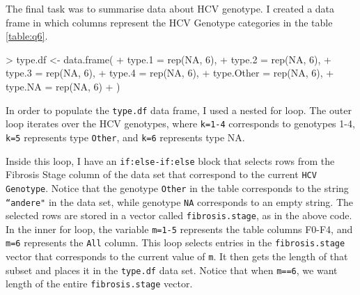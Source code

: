 \documentclass{article}
\begin{document}
\begin{enumerate}
\begin{enumerate}
The final task was to summarise data about HCV genotype. I created a data frame in which columns represent the HCV Genotype categories in the table \ref{table:q6}. 
\begin{Schunk}
\begin{Sinput}
> type.df <- data.frame(
+   type.1 = rep(NA, 6),
+   type.2 = rep(NA, 6),
+   type.3 = rep(NA, 6),
+   type.4 = rep(NA, 6),
+   type.Other = rep(NA, 6),
+   type.NA = rep(NA, 6)
+ )
\end{Sinput}
\end{Schunk}
In order to populate the \texttt{type.df} data frame, I used a nested for loop. The outer loop iterates over the HCV genotypes, where \texttt{k=1-4} corresponds to genotypes 1-4, \texttt{k=5} represents type \texttt{Other}, and \texttt{k=6} represents type {NA}. 
\begin{Schunk}
\end{Schunk}
Inside this loop, I have an \texttt{if:else-if:else} block that selects rows from the Fibrosis Stage column of the data set that correspond to the current \texttt{HCV Genotype}. Notice that the genotype \texttt{Other} in the table corresponds to the string \texttt{``andere"} in the data set, while genotype \texttt{NA} corresponds to an empty string. The selected rows are stored in a vector called \texttt{fibrosis.stage}, as in the above code.\\
In the inner for loop, the variable \texttt{m=1-5} represents the table columns F0-F4, and \texttt{m=6} represents the \texttt{All} column. This loop selects entries in the \texttt{fibrosis.stage} vector that corresponds to the current value of \texttt{m}. It then gets the length of that subset and places it in the \texttt{type.df} data set. Notice that when \texttt{m==6}, we want length of the entire \texttt{fibrosis.stage} vector.\\


\end{enumerate}
\end{enumerate}
\end{document}
